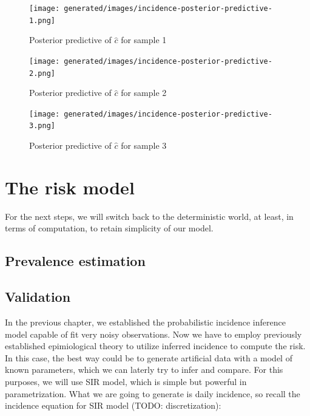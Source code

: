 \documentclass[
  digital, %
  oneside, %
  lof,     %
  lot,     %
]{fithesis4}
\begin{document}

\begin{figure}[h]
  \centering
  \texttt{[image: generated/images/incidence-posterior-predictive-1.png]}
  \caption{Posterior predictive of $\hat{c}$ for sample 1}
  \label{fig:incidence-posterior-1}
\end{figure}

\begin{figure}[h]
  \centering
  \texttt{[image: generated/images/incidence-posterior-predictive-2.png]}
  \caption{Posterior predictive of $\hat{c}$ for sample 2}
  \label{fig:incidence-posterior-2}
\end{figure}

\begin{figure}[h]
  \centering
  \texttt{[image: generated/images/incidence-posterior-predictive-3.png]}
  \caption{Posterior predictive of $\hat{c}$ for sample 3}
  \label{fig:incidence-posterior-3}
\end{figure}


\chapter{The risk model}

For the next steps, we will switch back to the deterministic 
world, at least, in terms of computation, to retain simplicity of our model.

\section{Prevalence estimation}

\section{Validation}

In the previous chapter, we established the probabilistic
incidence inference model capable of fit very noisy observations.
Now we have to employ previously established epimiological theory
to utilize inferred incidence to compute the risk.
In this case, the best way could be to generate artificial data
with a model of known parameters, which we can laterly try to
infer and compare.
For this purposes, we will use SIR model, which is simple 
but powerful in parametrization.
What we are going to generate is daily incidence, so recall 
the incidence equation for SIR model (TODO: discretization):
\end{document}

